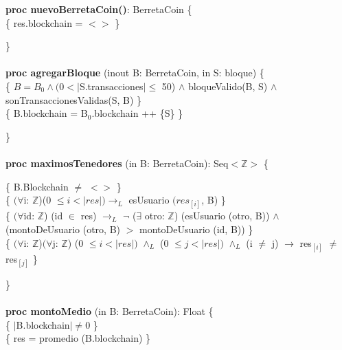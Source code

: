 \documentclass{article}
\newcommand{\Entero}{$\mathds{Z}$}
\begin{document}
        {\selectfont\textbf{proc nuevoBerretaCoin()}: BerretaCoin} \{\\
        \indent{} \{ res.blockchain = $<>$ \}

    \}\\\\

    {\selectfont\textbf{proc agregarBloque} (inout B: BerretaCoin, in S: bloque)} \{\\
        \indent{} \{ $B = B_0 \land (0 < |$S.transacciones$| \leq$ 50) $\land$ bloqueValido(B, S) $\land$ sonTransaccionesValidas(S, B) \}\\
        \indent{} \{ B.blockchain = B${_0}$.blockchain ++ \{S\} \}

    \}\\\\

    {\selectfont\textbf{proc maximosTenedores} (in B: BerretaCoin): Seq$<$\Entero$>$} \{

        \indent{} \{ B.Blockchain $\ne$ $<>$ \}\\
        \indent{} \{ $(\forall$i: \Entero)(0 $\le i < |res|) \rightarrow_{L}$
                                            esUsuario $(res_{[i]}$, B) \}\\
        \indent{} \{ $(\forall$id: \Entero) (id $\in$ res) $\rightarrow_{L}$
                                         $\neg$ ($\exists$ otro: \Entero) (esUsuario (otro, B)) $\land$\\
        \indent\indent\indent\indent\indent (montoDeUsuario (otro, B) $>$ montoDeUsuario (id, B)) \}\\
        \indent{} \{ $(\forall$i: \Entero)$(\forall$j: \Entero) (0 $\le i < |res|)$ $\land_{L}$ (0 $\le j < |res|)$ $\land_{L}$ (i $\ne$ j) $\rightarrow$ res$_{[i]}$ $\ne$ res$_{[j]}$ \}

    \}\\\\

    {\selectfont\textbf{proc montoMedio} (in B: BerretaCoin): Float} \{\\
        \indent{} \{ $|$B.blockchain$| \ne 0$ \}\\
        \indent{} \{ res = promedio (B.blockchain) \}
\end{document}
